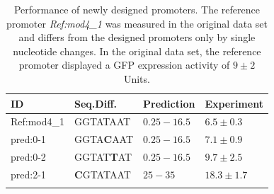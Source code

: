 \documentclass[utf8]{frontiersSCNS} %
\begin{document}
\newpage
\begin{table}[h!]
    \caption{Performance of newly designed promoters. The reference promoter \textit{Ref:mod4\_1} was measured in the original data set and differs from the designed promoters only by single nucleotide changes. In the original data set, the reference promoter displayed a GFP expression activity of $9\pm2$ Units. \label{Tab:PputNew}}
    {
    \begin{tabular}{@{}l|l|l|l@{}}
        \toprule
        ID              & Seq.Diff.     & Prediction     & Experiment \\\hline%
        Ref:mod4\_1      & GGTATAAT      & $0.25-16.5$       & $6.5\pm0.3$\\\hline
        pred:0-1        & GGTA\textbf{C}AAT      & $0.25-16.5$   & $7.1\pm0.9$\\
        pred:0-2        & GGTAT\textbf{T}AT      & $0.25-16.5$   & $9.7\pm2.5$\\\hline
        pred:2-1        & \textbf{C}GTATAAT      & $25-35$       & $18.3\pm1.7$\\
        \botrule
    \end{tabular}
    }
    {} %
\end{table}
\end{document}
